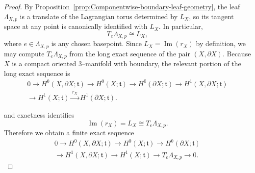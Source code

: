 \documentclass[12pt]{amsart}
\numberwithin{equation}{section}
\begin{document}
\begin{proof}
By Proposition~\ref{prop:Componentwise-boundary-leaf-geometry}, the leaf $\Lambda_{X,p}$ is a translate of the
Lagrangian torus determined by $L_X$, so its tangent space at any point is canonically identified with
$L_X$. In particular,
\[
T_e\Lambda_{X,p}\cong L_X,
\]
where $e\in \Lambda_{X,p}$ is any chosen basepoint. Since $L_X=\operatorname{Im}(r_X)$ by
definition, we may compute $T_e\Lambda_{X,p}$ from the long exact sequence of the pair
$(X,\partial X)$. Because $X$ is a compact oriented $3$--manifold with boundary, the relevant portion of the long exact
sequence is
\[
\begin{aligned}
0 \longrightarrow H^0(X,\partial X;\mathfrak t)
\longrightarrow H^0(X;\mathfrak t)
\longrightarrow H^0(\partial X;\mathfrak t)
\longrightarrow H^1(X,\partial X;\mathfrak t) \\
\longrightarrow H^1(X;\mathfrak t)
\xrightarrow{\,r_X\,}
H^1(\partial X;\mathfrak t).
\end{aligned}
\]

and exactness identifies
\[
\operatorname{Im}(r_X)=L_X\cong T_e\Lambda_{X,p}.
\]
Therefore we obtain a finite exact sequence
\[
\begin{aligned}
0 \longrightarrow H^0(X,\partial X;\mathfrak t)
\longrightarrow H^0(X;\mathfrak t)
\longrightarrow H^0(\partial X;\mathfrak t) \\
\longrightarrow H^1(X,\partial X;\mathfrak t)
\longrightarrow H^1(X;\mathfrak t)
\longrightarrow T_e\Lambda_{X,p}
\longrightarrow 0.
\end{aligned}
\]


\end{proof}
\end{document}
